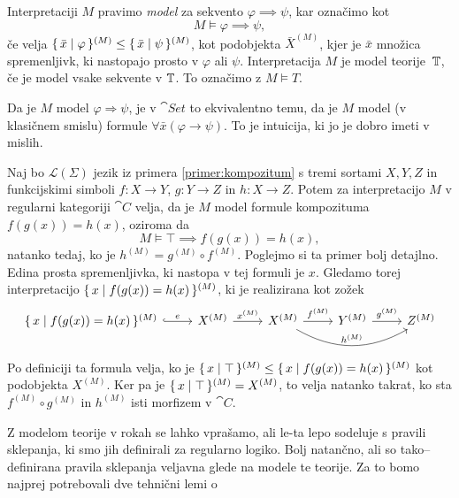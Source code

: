 \documentclass[../kategoricna_logika.tex]{subfiles}
\begin{document}
\begin{definicija}
  Interpretaciji $M$ pravimo \emph{model} za sekvento
  $\varphi \implies \psi$, kar označimo kot
  $$M \models \varphi \implies \psi,$$
  če velja
  $\lbrace\,\bar{x} \mid \varphi\,\rbrace^{(M)} \leq \lbrace\,\bar{x} \mid
    \psi\,\rbrace^{(M)}$, kot podobjekta $\bar{X}^{(M)}$, kjer je $\bar{x}$
  množica spremenljivk, ki nastopajo prosto v $\varphi$ ali $\psi$.
  Interpretacija $M$ je model teorije~$\mathbb{T}$, če je model vsake sekvente
  v $\mathbb{T}$.  To označimo z $M \models T$.
\end{definicija}
\begin{opomba}
  Da je $M$ model $\varphi \Rightarrow \psi$, je v $\cat{Set}$ to
  ekvivalentno temu, da je $M$ model (v klasičnem smislu) formule
  $\forall \bar{x} (\varphi \rightarrow \psi)$. To je intuicija, ki jo
  je dobro imeti v mislih.
\end{opomba}
\begin{primer}
  Naj bo $\mathcal{L}(\Sigma)$ jezik iz primera
  \ref{primer:kompozitum} s tremi sortami $X,Y,Z$ in funkcijskimi simboli
  $f : X \to Y$, $g : Y \to Z$ in $h : X \to Z$.  Potem za
  interpretacijo $M$ v regularni kategoriji $\cat{C}$ velja, da je $M$
  model formule kompozituma $f(g(x)) = h(x)$, oziroma da
  $$M \models \top \implies f(g(x)) = h(x),$$ 
  natanko tedaj, ko je $h^{(M)} = g^{(M)} \circ f^{(M)}$.  Poglejmo si
  ta primer bolj detajlno.  Edina prosta spremenljivka, ki nastopa v
  tej formuli je $x$. Gledamo torej interpretacijo
  $\lbrace\,x  \mid  f(g(x)) = h(x)\,\rbrace^{(M)}$, ki je realizirana kot
  zožek
  \begin{equation*}
    \begin{tikzcd}[column sep=normal]
      \set{x  \mid  f(g(x)) = h(x)}^{(M)} \ar[r, hook, "e"] &
      X^{(M)} \ar[r, "x^{(M)}"] & X^{(M)} \ar[r, "f^{(M)}"] \ar[rr,
      bend right, "h^{(M)}"] & Y^{(M)} \ar[r, "g^{(M)}"] & Z^{(M)}
    \end{tikzcd}
  \end{equation*}
  Po definiciji ta formula velja, ko je
  $\lbrace\,x  \mid  \top\,\rbrace^{(M)} \leq \lbrace\,x  \mid  f(g(x)) =
    h(x)\,\rbrace^{(M)}$ kot podobjekta $X^{(M)}$.  Ker pa je
  $\lbrace\,x  \mid  \top\,\rbrace^{(M)} = X^{(M)}$, to velja natanko
  takrat, ko sta $f^{(M)} \circ g^{(M)}$ in $h^{(M)}$ isti morfizem v
  $\cat{C}$.
\end{primer}
Z modelom teorije v rokah se lahko vprašamo, ali le-ta lepo sodeluje s
pravili sklepanja, ki smo jih definirali za regularno logiko.  Bolj
natančno, ali so tako--definirana pravila sklepanja veljavna glede na
modele te teorije.  Za to bomo najprej potrebovali dve tehnični lemi o
\end{document}
